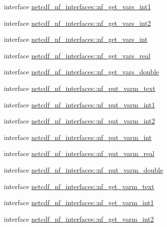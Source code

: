 \begin{DoxyCompactItemize}
\item 
interface \hyperlink{interfacenetcdf__nf__interfaces_1_1nf__get__vars__int1}{netcdf\+\_\+nf\+\_\+interfaces\+::nf\+\_\+get\+\_\+vars\+\_\+int1}
\item 
interface \hyperlink{interfacenetcdf__nf__interfaces_1_1nf__get__vars__int2}{netcdf\+\_\+nf\+\_\+interfaces\+::nf\+\_\+get\+\_\+vars\+\_\+int2}
\item 
interface \hyperlink{interfacenetcdf__nf__interfaces_1_1nf__get__vars__int}{netcdf\+\_\+nf\+\_\+interfaces\+::nf\+\_\+get\+\_\+vars\+\_\+int}
\item 
interface \hyperlink{interfacenetcdf__nf__interfaces_1_1nf__get__vars__real}{netcdf\+\_\+nf\+\_\+interfaces\+::nf\+\_\+get\+\_\+vars\+\_\+real}
\item 
interface \hyperlink{interfacenetcdf__nf__interfaces_1_1nf__get__vars__double}{netcdf\+\_\+nf\+\_\+interfaces\+::nf\+\_\+get\+\_\+vars\+\_\+double}
\item 
interface \hyperlink{interfacenetcdf__nf__interfaces_1_1nf__put__varm__text}{netcdf\+\_\+nf\+\_\+interfaces\+::nf\+\_\+put\+\_\+varm\+\_\+text}
\item 
interface \hyperlink{interfacenetcdf__nf__interfaces_1_1nf__put__varm__int1}{netcdf\+\_\+nf\+\_\+interfaces\+::nf\+\_\+put\+\_\+varm\+\_\+int1}
\item 
interface \hyperlink{interfacenetcdf__nf__interfaces_1_1nf__put__varm__int2}{netcdf\+\_\+nf\+\_\+interfaces\+::nf\+\_\+put\+\_\+varm\+\_\+int2}
\item 
interface \hyperlink{interfacenetcdf__nf__interfaces_1_1nf__put__varm__int}{netcdf\+\_\+nf\+\_\+interfaces\+::nf\+\_\+put\+\_\+varm\+\_\+int}
\item 
interface \hyperlink{interfacenetcdf__nf__interfaces_1_1nf__put__varm__real}{netcdf\+\_\+nf\+\_\+interfaces\+::nf\+\_\+put\+\_\+varm\+\_\+real}
\item 
interface \hyperlink{interfacenetcdf__nf__interfaces_1_1nf__put__varm__double}{netcdf\+\_\+nf\+\_\+interfaces\+::nf\+\_\+put\+\_\+varm\+\_\+double}
\item 
interface \hyperlink{interfacenetcdf__nf__interfaces_1_1nf__get__varm__text}{netcdf\+\_\+nf\+\_\+interfaces\+::nf\+\_\+get\+\_\+varm\+\_\+text}
\item 
interface \hyperlink{interfacenetcdf__nf__interfaces_1_1nf__get__varm__int1}{netcdf\+\_\+nf\+\_\+interfaces\+::nf\+\_\+get\+\_\+varm\+\_\+int1}
\item 
interface \hyperlink{interfacenetcdf__nf__interfaces_1_1nf__get__varm__int2}{netcdf\+\_\+nf\+\_\+interfaces\+::nf\+\_\+get\+\_\+varm\+\_\+int2}

\end{DoxyCompactItemize}
